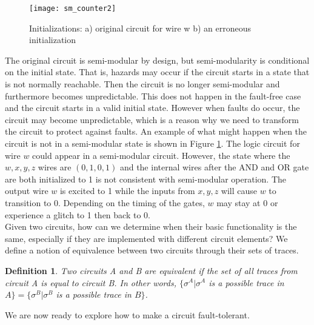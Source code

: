 \documentclass[12pt]{report}
\newtheorem*{definition}{Definition}
\begin{document}
\begin{figure}
  \centering
    \texttt{[image: sm\_counter2]}
  \caption[Initializations]{Initializations: a) original circuit for wire w b) an erroneous initialization}
  \label{fig:sm_counter2}
\end{figure}

The original circuit is semi-modular by design, but semi-modularity is conditional on the initial state.  That is, hazards may occur if the circuit starts in a state that is not normally reachable.  Then the circuit is no longer semi-modular and furthermore becomes unpredictable.  This does not happen in the fault-free case and the circuit starts in a valid initial state.  However when faults do occur, the circuit may become unpredictable, which is a reason why we need to transform the circuit to protect against faults.  An example of what might happen when the circuit is not in a semi-modular state is shown in Figure \ref{fig:sm_counter2}.  The logic circuit for wire $w$ could appear in a semi-modular circuit.  However, the state where the $w,x,y,z$ wires are $(0,1,0,1)$ and the internal wires after the AND and OR gate are both initialized to 1 is not consistent with semi-modular operation.  The output wire $w$ is excited to 1 while the inputs from $x,y,z$ will cause $w$ to transition to 0.  Depending on the timing of the gates, $w$ may stay at 0 or experience a glitch to 1 then back to 0.\\

Given two circuits, how can we determine when their basic functionality is the same, especially if they are implemented with different circuit elements?  We define a notion of equivalence between two circuits through their sets of traces.  
\begin{definition} Two circuits A and B are {\em equivalent} if the set of all traces from circuit A is equal to circuit B.  In other words, $\{\sigma^A |\sigma^A$ is a possible trace in $A\}=\{\sigma^B |\sigma^B$ is a possible trace in $B\}$.
\end{definition}

We are now ready to explore how to make a circuit fault-tolerant.
\end{document}
